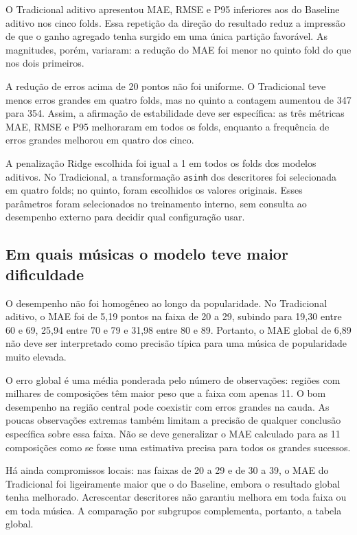 

O Tradicional aditivo apresentou MAE, RMSE e P95 inferiores aos do Baseline aditivo nos cinco folds. Essa repetição da direção do resultado reduz a impressão de que o ganho agregado tenha surgido em uma única partição favorável. As magnitudes, porém, variaram: a redução do MAE foi menor no quinto fold do que nos dois primeiros.

A redução de erros acima de 20 pontos não foi uniforme. O Tradicional teve menos erros grandes em quatro folds, mas no quinto a contagem aumentou de 347 para 354. Assim, a afirmação de estabilidade deve ser específica: as três métricas MAE, RMSE e P95 melhoraram em todos os folds, enquanto a frequência de erros grandes melhorou em quatro dos cinco.

A penalização Ridge escolhida foi igual a 1 em todos os folds dos modelos aditivos. No Tradicional, a transformação \texttt{asinh} dos descritores foi selecionada em quatro folds; no quinto, foram escolhidos os valores originais. Esses parâmetros foram selecionados no treinamento interno, sem consulta ao desempenho externo para decidir qual configuração usar.

\subsection{Em quais músicas o modelo teve maior dificuldade}



O desempenho não foi homogêneo ao longo da popularidade. No Tradicional aditivo, o MAE foi de 5,19 pontos na faixa de 20 a 29, subindo para 19,30 entre 60 e 69, 25,94 entre 70 e 79 e 31,98 entre 80 e 89. Portanto, o MAE global de 6,89 não deve ser interpretado como precisão típica para uma música de popularidade muito elevada.

O erro global é uma média ponderada pelo número de observações: regiões com milhares de composições têm maior peso que a faixa com apenas 11. O bom desempenho na região central pode coexistir com erros grandes na cauda. As poucas observações extremas também limitam a precisão de qualquer conclusão específica sobre essa faixa. Não se deve generalizar o MAE calculado para as 11 composições como se fosse uma estimativa precisa para todos os grandes sucessos.

Há ainda compromissos locais: nas faixas de 20 a 29 e de 30 a 39, o MAE do Tradicional foi ligeiramente maior que o do Baseline, embora o resultado global tenha melhorado. Acrescentar descritores não garantiu melhora em toda faixa ou em toda música. A comparação por subgrupos complementa, portanto, a tabela global.

